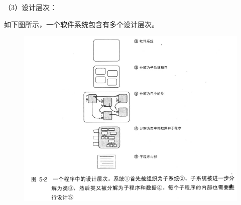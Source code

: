 \documentclass{article}
\begin{document}
\par
（3）设计层次：
\par
如下图所示，一个软件系统包含有多个设计层次。
\begin{figure}[ht]
    \centering
    \includegraphics[width=15cm]{figure2.png}
\end{figure}
\end{document}
